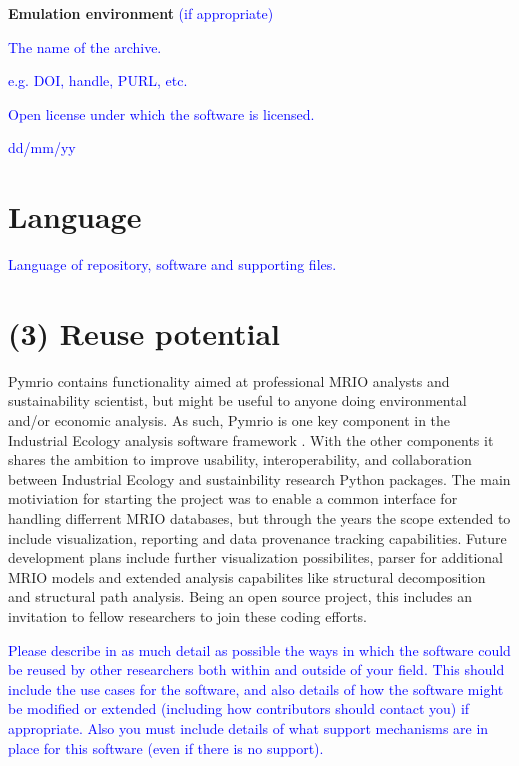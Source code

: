 \documentclass{jors}
\begin{document}
{\bf Emulation environment} \textcolor{blue}{(if appropriate)}

\begin{description}[noitemsep,topsep=0pt]
	\item[Name:] \textcolor{blue}{The name of the archive.}
	\item[Persistent identifier:] \textcolor{blue}{e.g. DOI, handle, PURL, etc.}
	\item[Licence:] \textcolor{blue}{Open license under which the software is licensed.}
	\item[Date published:] \textcolor{blue}{dd/mm/yy}
\end{description}

\section*{Language}

\textcolor{blue}{Language of repository, software and supporting files.}

\section*{(3) Reuse potential}

Pymrio contains functionality aimed at professional MRIO analysts and sustainability scientist, but might be useful to anyone doing environmental and/or economic analysis. 
As such, Pymrio is one key component in the Industrial Ecology analysis software framework \cite{pauliuk2015}.
With the other components it shares the ambition to improve usability, interoperability, and collaboration between Industrial Ecology and sustainbility research Python packages.
The main motiviation for starting the project was to enable a common interface for handling differrent MRIO databases, but through the years the scope extended to include visualization, reporting and data provenance tracking capabilities.
Future development plans include further visualization possibilites, parser for additional MRIO models and extended analysis capabilites like structural decomposition and structural path analysis.
Being an open source project, this includes an invitation to fellow researchers to join these coding efforts.



\textcolor{blue}{Please describe in as much detail as possible the ways in which the software could be reused by other researchers both within and outside of your field. This should include the use cases for the software, and also details of how the software might be modified or extended (including how contributors should contact you) if appropriate. Also you must include details of what support mechanisms are in place for this software (even if there is no support).}
\end{document}

